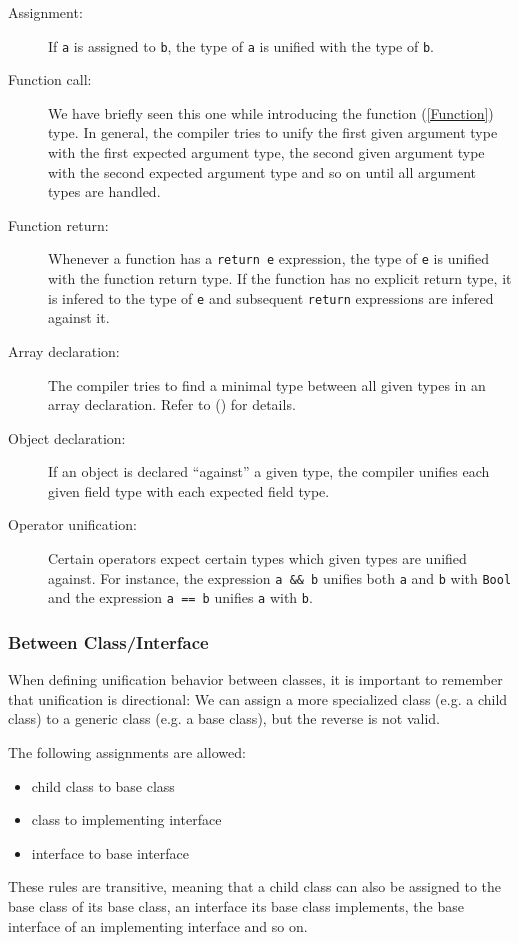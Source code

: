 \documentclass{article}
\newcommand{\type}[1]{\texttt{#1}}
\newcommand{\expr}[1]{\texttt{#1}}
\newcommand{\Fullref}[1]{\nameref{#1} (\Cref{#1})}
\newcommand{\tref}[2]{#1 (\ref{#2})}
\begin{document}
\begin{description}
	\item[Assignment:] If \expr{a} is assigned to \expr{b}, the type of \expr{a} is unified with the type of \expr{b}.
	\item[Function call:] We have briefly seen this one while introducing the \tref{function}{Function} type. In general, the compiler tries to unify the first given argument type with the first expected argument type, the second given argument type with the second expected argument type and so on until all argument types are handled.
	\item[Function return:] Whenever a function has a \expr{return e} expression, the type of \expr{e} is unified with the function return type. If the function has no explicit return type, it is infered to the type of \expr{e} and subsequent \expr{return} expressions are infered against it.
	\item[Array declaration:] The compiler tries to find a minimal type between all given types in an array declaration. Refer to \Fullref{Common Base Type} for details.
	\item[Object declaration:] If an object is declared ``against'' a given type, the compiler unifies each given field type with each expected field type.
	\item[Operator unification:] Certain operators expect certain types which given types are unified against. For instance, the expression \expr{a \&\& b} unifies both \expr{a} and \expr{b} with \type{Bool} and the expression \expr{a == b} unifies \expr{a} with \expr{b}.
\end{description}


\subsubsection{Between Class/Interface}

When defining unification behavior between classes, it is important to remember that unification is directional: We can assign a more specialized class (e.g. a child class) to a generic class (e.g. a base class), but the reverse is not valid.

The following assignments are allowed:

\begin{itemize}
	\item child class to base class
	\item class to implementing interface
	\item interface to base interface
\end{itemize}
These rules are transitive, meaning that a child class can also be assigned to the base class of its base class, an interface its base class implements, the base interface of an implementing interface and so on.
\end{document}
